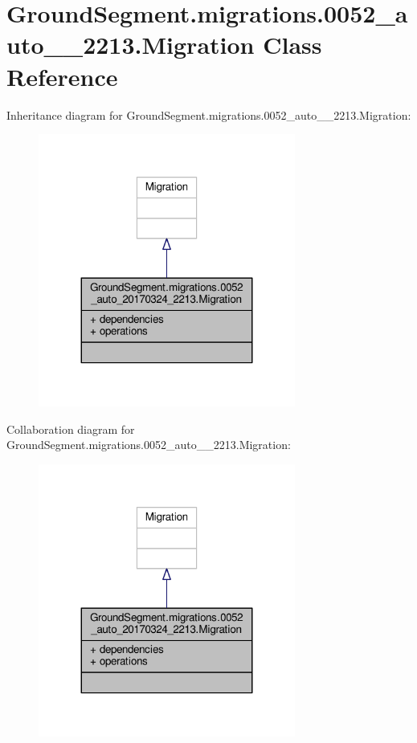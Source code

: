 \hypertarget{class_ground_segment_1_1migrations_1_10052__auto__20170324__2213_1_1_migration}{}\section{Ground\+Segment.\+migrations.0052\+\_\+auto\+\_\+\_\+2213.Migration Class Reference}
\label{class_ground_segment_1_1migrations_1_10052__auto__20170324__2213_1_1_migration}


Inheritance diagram for Ground\+Segment.\+migrations.0052\+\_\+auto\+\_\+\_\+2213.Migration\+:\nopagebreak
\begin{figure}[H]
\begin{center}
\leavevmode
\includegraphics[width=239pt]{class_ground_segment_1_1migrations_1_10052__auto__20170324__2213_1_1_migration__inherit__graph}
\end{center}
\end{figure}


Collaboration diagram for Ground\+Segment.\+migrations.0052\+\_\+auto\+\_\+\_\+2213.Migration\+:\nopagebreak
\begin{figure}[H]
\begin{center}
\leavevmode
\includegraphics[width=239pt]{class_ground_segment_1_1migrations_1_10052__auto__20170324__2213_1_1_migration__coll__graph}
\end{center}
\end{figure}
